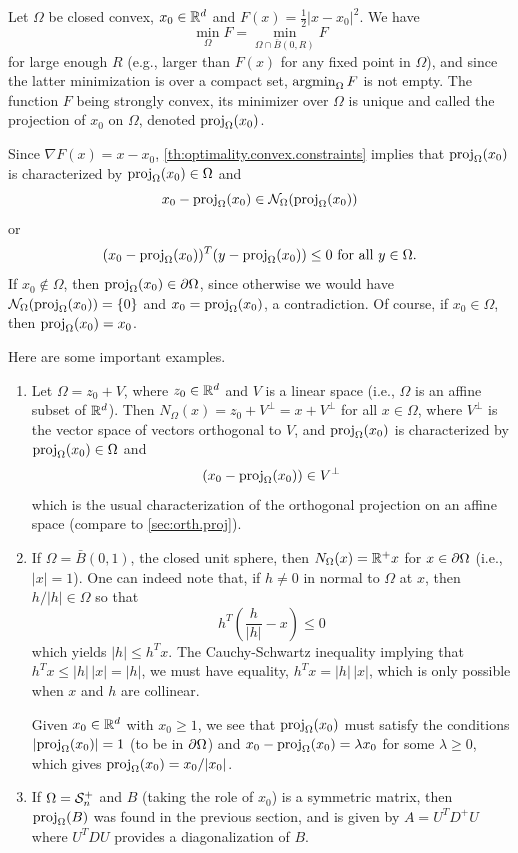 Let $\Omega$ be closed convex, $x_0\in {\mathbb{R}}^d$ and $F(x) =\frac12 |x-x_0|^2$. We have 
\[
\min_\Omega F = \min_{\Omega\cap \bar B(0, R)} F
\]
for large enough $R$ (e.g., larger than $F(x)$ for any fixed point in $\Omega$), and since the latter minimization is over a compact set, $\operatorname*{argmin}_\Omega F$ is not empty. The function $F$ being strongly convex, its minimizer over $\Omega$ is unique and called the projection of $x_0$ on $\Omega$, denoted $\mathrm{proj}_\Omega(x_0)$. 

Since $\nabla F(x) = x-x_0$, \cref{th:optimality.convex.constraints} implies that $\mathrm{proj}_\Omega(x_0)$ is characterized by $\mathrm{proj}_{\Omega}(x_0) \in \Omega$ and
\begin{equation}
\label{eq:projection.1}
x_0 - \mathrm{proj}_\Omega(x_0)  \in {\mathcal N}_\Omega(\mathrm{proj}_\Omega(x_0))
\end{equation}
or
\begin{equation}
\label{eq:projection.2}
(x_0 - \mathrm{proj}_\Omega(x_0) )^T(y-  \mathrm{proj}_\Omega(x_0)) \leq 0 \text{ for all } y\in \Omega.
\end{equation}
If $x_0\not\in \Omega$, then $\mathrm{proj}_\Omega(x_0) \in \partial\Omega$, since otherwise we would have ${\mathcal N}_\Omega(\mathrm{proj}_\Omega(x_0)) = \{0\}$ and $x_0 = \mathrm{proj}_\Omega(x_0)$, a contradiction. Of course, if $x_0\in \Omega$, then $\mathrm{proj}_\Omega(x_0) = x_0$.

Here are some important examples.
\begin{enumerate}[label={\bf\arabic*.}, wide]
\item
Let $\Omega = z_0 + V$, where $z_0\in {\mathbb{R}}^d$ and $V$ is a linear space (i.e., $\Omega$ is an affine subset of ${\mathbb{R}}^d$). Then $N_\Omega(x) = z_0 + V^\perp = x + V^\perp$ for all $x\in \Omega$, where $V^\perp$ is the vector space of vectors orthogonal to $V$, and $\mathrm{proj}_\Omega(x_0)$ is characterized by $\mathrm{proj}_\Omega(x_0)\in \Omega$ and
\[
(x_0 - \mathrm{proj}_\Omega(x_0) ) \in V^\perp
\]
which is the usual characterization of the orthogonal projection on an affine space (compare to \cref{sec:orth.proj}).
\item
If $\Omega = \bar B(0,1)$, the closed unit sphere, then $N_\Omega(x) = {\mathbb{R}}^+ x$ for $x\in \partial\Omega$ (i.e., $|x|=1$).  One can indeed note that, if $h\neq 0$ in normal to $\Omega$ at $x$, then $h/|h| \in \Omega$ so that
\[
h^T\left(\frac{h}{|h|} - x\right) \leq 0
\]
which yields $|h| \leq h^T x$. The Cauchy-Schwartz inequality implying that $h^T x \leq |h|\,|x|=|h|$, we must have equality, $h^T x = |h|\, |x|$, which is only possible when $x$ and $h$ are collinear.

Given $x_0\in {\mathbb{R}}^d$ with $x_0 \geq 1$, we see that $\mathrm{proj}_{\Omega}(x_0)$ must satisfy the conditions $|\mathrm{proj}_\Omega(x_0)|  =  1$ (to be in $\partial\Omega$) and $x_0 - \mathrm{proj}_\Omega(x_0) = \lambda x_0$ for some $\lambda \geq 0$, which gives $\mathrm{proj}_{\Omega}(x_0) = x_0/|x_0|$.  

\item If $\Omega = {\mathcal S}^+_n$ and $B$ (taking the role of $x_0$) is a symmetric matrix, then 
$\mathrm{proj}_\Omega(B)$ was found in the previous section, and is given by $A = U^T D^+ U$ where $U^TDU$ provides  a diagonalization of $B$.
 
\end{enumerate}

